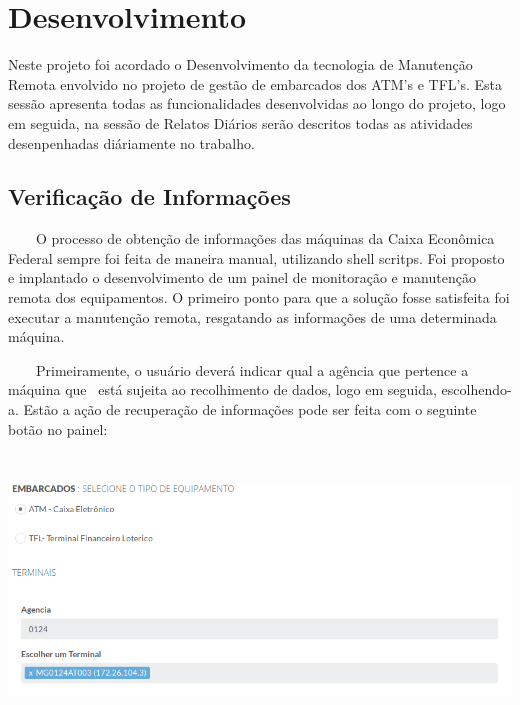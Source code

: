 \chapter[Desenvolvimento ]{Desenvolvimento}
Neste projeto foi acordado o Desenvolvimento da tecnologia de Manutenção Remota envolvido no projeto de gestão de embarcados dos ATM’s e TFL’s.
Esta sessão apresenta todas as funcionalidades desenvolvidas ao longo do projeto, logo em seguida, na sessão de
Relatos Diários serão descritos todas as atividades desenpenhadas diáriamente no trabalho.

\section{Verifica\c{c}\~ao de Informa\c{c}\~oes}

\bigskip

{\color{black}
    \ \ \ \ O processo de obten\c{c}\~ao de informa\c{c}\~oes das m\'aquinas da Caixa Econ\^omica Federal sempre foi feita
        de maneira manual, utilizando shell scritps. Foi proposto e implantado o desenvolvimento de um painel de
        monitora\c{c}\~ao e manuten\c{c}\~ao remota dos equipamentos. O primeiro ponto para que a solu\c{c}\~ao fosse
        satisfeita foi executar a manuten\c{c}\~ao remota, resgatando as informa\c{c}\~oes de uma determinada m\'aquina. }

{\color{black}
    \ \ \ \ Primeiramente, o usu\'ario dever\'a indicar qual a ag\^encia que pertence a m\'aquina que \ est\'a sujeita ao
        recolhimento de dados, logo em seguida, escolhendo-a. Est\~ao a a\c{c}\~ao de recupera\c{c}\~ao de informa\c{c}\~oes
        pode ser feita com o seguinte bot\~ao no painel:}

        \begin{center}
        \includegraphics[width=17.029cm,height=7.22cm]{figuras/RATCETECATMSTFLS051718v2-img002.png}
        \end{center}



